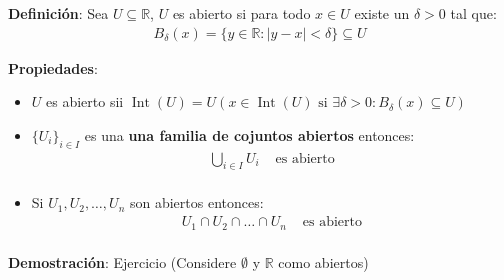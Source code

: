 \textbf{Definición}: Sea $U \subseteq \mathbb{R}$, $U$ es abierto si para todo $x \in U$ existe un $\delta>0$ tal que:
\begin{align*}
    B_\delta(x) = \{y \in \mathbb{R} : |y - x| < \delta\} \subseteq U
\end{align*}
\begin{center}
\end{center}

\textbf{Propiedades}:

\begin{itemize}
    \item $U$ es abierto sii $\operatorname{Int}(U) = U (x \in \operatorname{Int}(U) \text{ si } \exists \delta > 0: B_\delta(x) \subseteq U)$
    \item $\{U_i\}_{i \in I}$ es una \textbf{una familia de cojuntos abiertos} entonces:
    \begin{align*}
        \bigcup_{i \in I} U_i &\text{ es abierto} \\
    \end{align*}
    \item Si $U_1, U_2, \dots, U_n$ son abiertos entonces:
    \begin{align*}
        U_1 \cap U_2 \cap \dots \cap U_n &\text{ es abierto} \\
    \end{align*}
\end{itemize}
\textbf{Demostración}: Ejercicio (Considere $\emptyset$ y $\mathbb{R}$ como abiertos)

